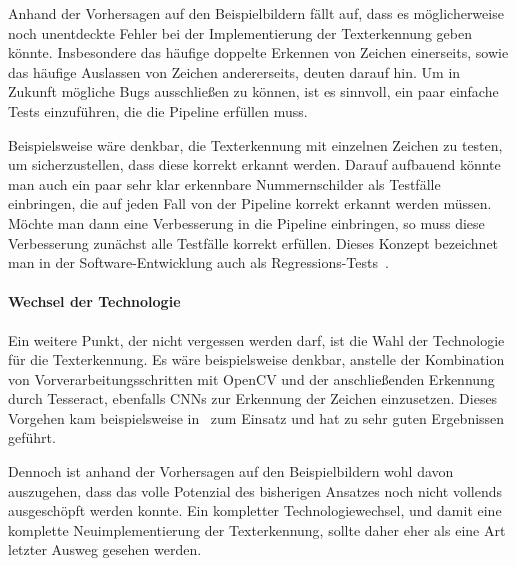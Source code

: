 Anhand der Vorhersagen auf den Beispielbildern f\"allt auf, dass es
m\"oglicherweise noch unentdeckte Fehler bei der Implementierung der
Texterkennung geben k\"onnte. Insbesondere das h\"aufige doppelte Erkennen
von Zeichen einerseits, sowie das h\"aufige Auslassen von Zeichen
andererseits,
deuten darauf hin. Um in Zukunft m\"ogliche \glqq Bugs\grqq{} ausschlie{\ss}en
zu k\"onnen, ist es sinnvoll, ein paar einfache Tests einzuf\"uhren,
die die Pipeline erf\"ullen muss.

Beispielsweise w\"are denkbar, die Texterkennung mit einzelnen Zeichen zu
testen, um sicherzustellen, dass diese korrekt erkannt werden.
Darauf aufbauend k\"onnte man auch ein paar sehr klar erkennbare
Nummernschilder als Testf\"alle einbringen, die auf jeden Fall von
der Pipeline korrekt erkannt werden m\"ussen.
M\"ochte man dann eine Verbesserung in die Pipeline einbringen, so
muss diese Verbesserung zun\"achst alle Testf\"alle korrekt erf\"ullen.
Dieses Konzept bezeichnet man in der Software-Entwicklung auch als
Regressions-Tests~\cite{testing}.

\paragraph{Wechsel der Technologie}

Ein weitere Punkt, der nicht vergessen werden darf, ist die Wahl der
Technologie f\"ur die Texterkennung.
Es w\"are beispielsweise denkbar, anstelle der Kombination von
Vorverarbeitungsschritten mit OpenCV und der anschlie{\ss}enden
Erkennung durch Tesseract, ebenfalls CNNs zur Erkennung der
Zeichen einzusetzen.
Dieses Vorgehen kam beispielsweise in~\cite{silva2018a} zum Einsatz und
hat zu sehr guten Ergebnissen gef\"uhrt.

Dennoch ist anhand der Vorhersagen auf den Beispielbildern
wohl davon auszugehen, dass das volle Potenzial des bisherigen
Ansatzes noch nicht vollends ausgesch\"opft werden konnte.
Ein kompletter Technologiewechsel, und damit eine komplette
Neuimplementierung der Texterkennung, sollte daher eher als eine
Art letzter Ausweg gesehen werden.
